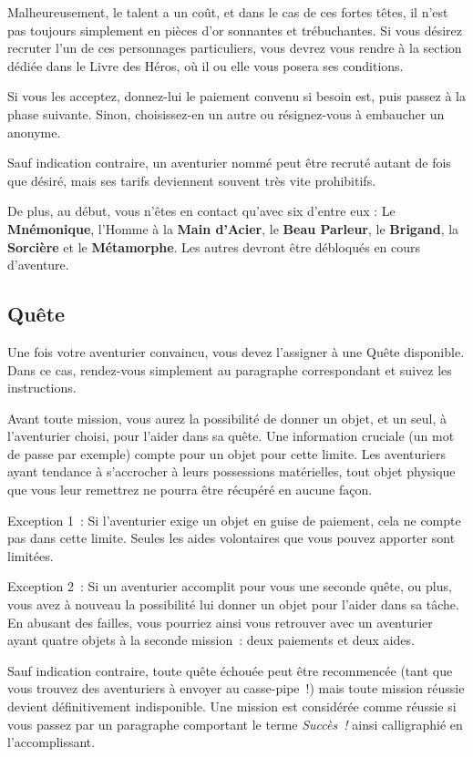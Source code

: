 \documentclass{report}
\begin{document}
Malheureusement, le talent a un coût, et dans le cas de ces fortes têtes, il n'est pas toujours simplement en pièces d'or sonnantes et trébuchantes. Si vous désirez recruter l'un de ces personnages particuliers, vous devrez vous rendre à la section dédiée dans le Livre des Héros, où il ou elle vous posera ses conditions.

Si vous les acceptez, donnez-lui le paiement convenu si besoin est, puis passez à la phase suivante. Sinon, choisissez-en un autre ou résignez-vous à embaucher un anonyme.

Sauf indication contraire, un aventurier nommé peut être recruté autant de fois que désiré, mais ses tarifs deviennent souvent très vite prohibitifs.

De plus, au début, vous n'êtes en contact qu'avec six d'entre eux : Le \textbf{Mnémonique}, l’Homme à la \textbf{Main d’Acier}, le \textbf{Beau Parleur}, le \textbf{Brigand}, la \textbf{Sorcière} et le \textbf{Métamorphe}. Les autres devront être débloqués en cours d'aventure.

\subsection{Quête}

Une fois votre aventurier convaincu, vous devez l'assigner à une Quête disponible. Dans ce cas, rendez-vous simplement au paragraphe correspondant et suivez les instructions.

Avant toute mission, vous aurez la possibilité de donner un objet, et un seul, à l'aventurier choisi, pour l'aider dans sa quête. Une information cruciale (un mot de passe par exemple) compte pour un objet pour cette limite. Les aventuriers ayant tendance à s'accrocher à leurs possessions matérielles, tout objet physique que vous leur remettrez ne pourra être récupéré en aucune façon.

Exception 1 : Si l'aventurier exige un objet en guise de paiement, cela ne compte pas dans cette limite. Seules les aides volontaires que vous pouvez apporter sont limitées.

Exception 2 : Si un aventurier accomplit pour vous une seconde quête, ou plus, vous avez à nouveau la possibilité lui donner un objet pour l'aider dans sa tâche. En abusant des failles, vous pourriez ainsi vous retrouver avec un aventurier ayant quatre objets à la seconde mission : deux paiements et deux aides.

Sauf indication contraire, toute quête échouée peut être recommencée (tant que vous trouvez des aventuriers à envoyer au casse-pipe !) mais toute mission réussie devient définitivement indisponible. Une mission est considérée comme réussie si vous passez par un paragraphe comportant le terme \emph{Succès !} ainsi calligraphié en l'accomplissant.
\end{document}
